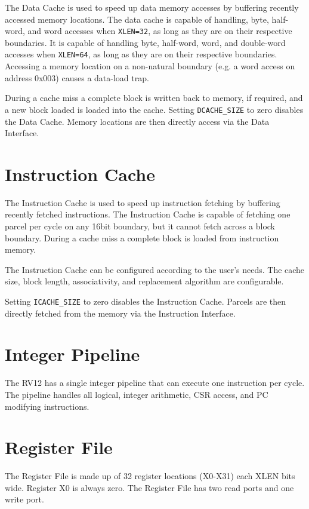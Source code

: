 The Data Cache is used to speed up data memory accesses by buffering
recently accessed memory locations. The data cache is capable of
handling, byte, half-word, and word accesses when \texttt{XLEN=32}, as long as
they are on their respective boundaries. It is capable of handling byte,
half-word, word, and double-word accesses when \texttt{XLEN=64}, as long as they
are on their respective boundaries. Accessing a memory location on a
non-natural boundary (e.g. a word access on address 0x003) causes a
data-load trap.

During a cache miss a complete block is written back to memory, if
required, and a new block loaded is loaded into the cache. Setting
\texttt{DCACHE\_SIZE} to zero disables the Data Cache. Memory locations
are then directly access via the Data Interface.

\section{Instruction Cache}\label{instruction-cache}

The Instruction Cache is used to speed up instruction fetching by
buffering recently fetched instructions. The Instruction Cache is
capable of fetching one parcel per cycle on any 16bit boundary, but it
cannot fetch across a block boundary. During a cache miss a complete
block is loaded from instruction memory.

The Instruction Cache can be configured according to the user's needs.
The cache size, block length, associativity, and replacement algorithm
are configurable.

Setting \texttt{ICACHE\_SIZE} to zero disables the Instruction Cache. Parcels
are then directly fetched from the memory via the Instruction Interface.

\section{Integer Pipeline}\label{integer-pipeline}

The RV12 has a single integer pipeline that can execute one instruction per
cycle. The pipeline handles all logical, integer arithmetic, CSR access, and PC
modifying instructions.


\section{Register File}\label{register-file}

The Register File is made up of 32 register locations (X0-X31) each XLEN
bits wide. Register X0 is always zero. The Register File has two read
ports and one write port.
